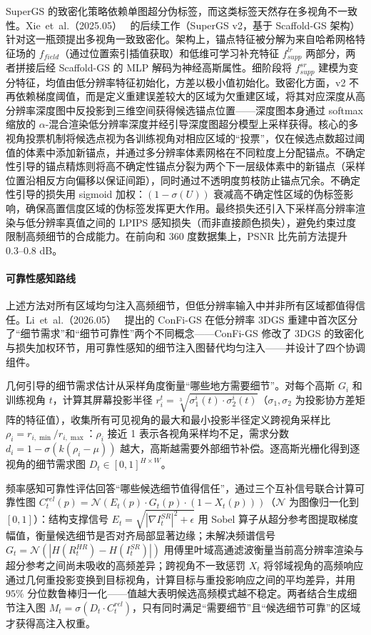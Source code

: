 SuperGS 的致密化策略依赖单图超分伪标签，而这类标签天然存在多视角不一致性。Xie~et~al.（2025.05）~\cite{2505_18649} 的后续工作（SuperGS v2，基于 Scaffold-GS 架构）针对这一瓶颈提出多视角一致致密化。架构上，锚点特征被分解为来自哈希网格特征场的 $f_{field}$（通过位置索引插值获取）和低维可学习补充特征 $f^{lr}_{supp}$ 两部分，两者拼接后经 Scaffold-GS 的 MLP 解码为神经高斯属性。细阶段将 $f^{sr}_{supp}$ 建模为变分特征，均值由低分辨率特征初始化，方差以极小值初始化。致密化方面，v2 不再依赖梯度阈值，而是定义重建误差较大的区域为欠重建区域，将其对应深度从高分辨率深度图中反投影到三维空间获得候选锚点位置——深度图本身通过 softmax 缩放的 $\alpha$-混合渲染低分辨率深度并经引导深度图超分模型上采样获得。核心的多视角投票机制将候选点视为各训练视角对相应区域的“投票”，仅在候选点数超过阈值的体素中添加新锚点，并通过多分辨率体素网格在不同粒度上分配锚点。不确定性引导的锚点精炼则将高不确定性锚点分裂为两个下一层级体素中的新锚点（采样位置沿相反方向偏移以保证间距），同时通过不透明度剪枝防止锚点冗余。不确定性引导的损失用 sigmoid 加权：$(1-\sigma(U))$ 衰减高不确定性区域的伪标签影响，确保高置信度区域的伪标签发挥更大作用。最终损失还引入下采样高分辨率渲染与低分辨率真值之间的 LPIPS 感知损失（而非直接颜色损失），避免约束过度限制高频细节的合成能力。在前向和 360 度数据集上，PSNR 比先前方法提升 0.3--0.8 dB。

\paragraph{可靠性感知路线}

上述方法对所有区域均匀注入高频细节，但低分辨率输入中并非所有区域都值得信任。Li~et~al.（2026.05）~\cite{2605_24964} 提出的 ConFi-GS 在低分辨率 3DGS 重建中首次区分了“细节需求”和“细节可靠性”两个不同概念——ConFi-GS 修改了 3DGS 的致密化与损失加权环节，用可靠性感知的细节注入图替代均匀注入——并设计了四个协调组件。

几何引导的细节需求估计从采样角度衡量“哪些地方需要细节”。对每个高斯 $G_i$ 和训练视角 $t$，计算其屏幕投影半径 $r_i^t = \sqrt[3]{\sigma_1^i(t) \cdot \sigma_2^i(t)}$（$\sigma_1, \sigma_2$ 为投影协方差矩阵的特征值），收集所有可见视角的最大和最小投影半径定义跨视角采样比 $\rho_i = r_{i,\min} / r_{i,\max}$：$\rho_i$ 接近 1 表示各视角采样均不足，需求分数 $d_i = 1 - \sigma(k(\rho_i - \mu))$ 越大，高斯越需要外部细节补偿。逐高斯光栅化得到逐视角的细节需求图 $D_t \in [0,1]^{H \times W}$。

频率感知可靠性评估回答“哪些候选细节值得信任”，通过三个互补信号联合计算可靠性图 $C_t^{rel}(p) = \mathcal{N}(E_t(p) \cdot G_t(p) \cdot (1 - X_t(p)))$（$\mathcal{N}$ 为图像归一化到 $[0,1]$）：结构支撑信号 $E_t = \sqrt{|\nabla I_t^{SR}|^2 + \epsilon}$ 用 Sobel 算子从超分参考图提取梯度幅值，衡量候选细节是否对齐局部显著边缘；未解决频谱信号 $G_t = \mathcal{N}(|H(R_t^{HR}) - H(I_t^{SR})|)$ 用傅里叶域高通滤波衡量当前高分辨率渲染与超分参考之间尚未吸收的高频差异；跨视角不一致惩罚 $X_t$ 将邻域视角的高频响应通过几何重投影变换到目标视角，计算目标与重投影响应之间的平均差异，并用 $95\%$ 分位数鲁棒归一化——值越大表明候选高频模式越不稳定。两者结合生成细节注入图 $M_t = \sigma(D_t \cdot C_t^{rel})$，只有同时满足“需要细节”且“候选细节可靠”的区域才获得高注入权重。

